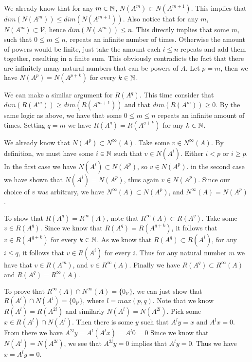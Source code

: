 \documentclass{article}
\begin{document}
\begin{solution}
  We already know that for any $m \in \mathbb{N}$, $N(A^m) \subset N(A^{m + 1})$.
  This implies that $dim(N(A^m)) \le dim(N(A^{m + 1}))$.
  Also notice that for any $m$, $N(A^m) \subset \mathcal{V}$, hence $dim(N(A^m)) \le n$.
  This directly implies that some $m$, such that $0 \le m \le n$, repeats an infinite number of times.
  Otherwise the amount of powers would be finite, just take the amount each $i \le n$ repeats and add them together, resulting in a finite sum.
  This obviously contradicts the fact that there are infinitely many natural numbers that can be powers of $A$.
  Let $p = m$, then we have $N(A^p) = N(A^{p + k})$ for every $k \in \mathbb{N}$.

  We can make a similar argument for $R(A^q)$.
  This time consider that $dim(R(A^m)) \ge dim(R(A^{m + 1}))$ and that $dim(R(A^m)) \ge 0$.
  By the same logic as above, we have that some $0 \le m \le n$ repeats an infinite amount of times.
  Setting $q = m$ we have $R(A^q) = R(A^{q + k})$ for any $k \in \mathbb{N}$.


  We already know that $N(A^p) \subset N^{\infty}(A)$.
  Take some $v \in N^{\infty}(A)$.
  By definition, we must have some $i \in \mathbb{N}$ such that $v \in N(A^i)$.
  Either $i < p$ or $i \ge p$.
  In the first case we have $N(A^i) \subset N(A^p)$, so $v \in N(A^p)$.
  in the second case we have shown that $N(A^i) = N(A^p)$, thus again $v \in N(A^p)$.
  Since our choice of $v$ was arbitrary, we have $N^{\infty}(A) \subset N(A^p)$, and $N^{\infty}(A) = N(A^p)$.

  To show that $R(A^q) = R^{\infty}(A)$, note that $R^{\infty}(A) \subset R(A^q)$.
  Take some $v \in R(A^q)$.
  Since we know that $R(A^q) = R(A^{q + k})$, it follows that $v \in R(A^{q + k})$ for every $k \in \mathbb{N}$.
  As we know that $R(A^q) \subset R(A^i)$, for any $i \le q$, it follows that $v \in R(A^i)$ for every $i$.
  Thus for any natural number $m$ we have that $v \in R(A^m)$, and $v \in R^{\infty}(A)$.
  Finally we have $R(A^q) \subset R^{\infty}(A)$ and $R(A^q) = R^{\infty}(A)$.


  To prove that $R^{\infty}(A) \cap N^{\infty}(A) = \{0_\mathcal{V}\}$, we can just show that $R(A^l) \cap N(A^l) = \{0_\mathcal{V}\}$, where $l = max(p, q)$.
  Note that we know $R(A^l) = R(A^{2 l})$ and similarly $N(A^l) = N(A^{2 l})$.
  Pick some $x \in R(A^l) \cap N(A^l)$.
  Then there is some $y$ such that $A^l y = x$ and $A^l x = 0$.
  From there we have $A^{2 l} y = A^l(A^l x) = A^l 0 = 0$ 
  Since we know that $N(A^l) = N(A^{2 l})$, we see that $A^{2 l} y = 0$ implies that $A^l y = 0$.
  Thus we have $x = A^l y = 0$.


\end{solution}
\end{document}
